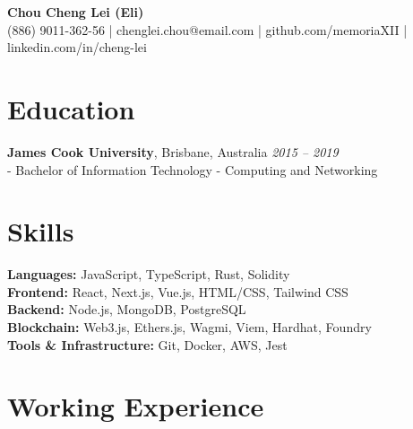 \documentclass[11pt,a4paper]{article}
\begin{document}
\begin{center}
    {\huge \textbf{Chou Cheng Lei (Eli)}}\\
    \vspace{5pt}
    (886) 9011-362-56 | chenglei.chou@email.com | github.com/memoriaXII | linkedin.com/in/cheng-lei
\end{center}

\vspace{5pt}

\section{Education}
\textbf{James Cook University}, Brisbane, Australia \hfill \textit{2015 -- 2019}\\
- Bachelor of Information Technology - Computing and Networking\\

\vspace{0pt}


\section{Skills}
\textbf{Languages:} JavaScript, TypeScript, Rust, Solidity\\
\textbf{Frontend:} React, Next.js, Vue.js, HTML/CSS, Tailwind CSS\\
\textbf{Backend:} Node.js, MongoDB, PostgreSQL\\
\textbf{Blockchain:} Web3.js, Ethers.js, Wagmi, Viem, Hardhat, Foundry\\
\textbf{Tools \& Infrastructure:} Git, Docker, AWS, Jest
\vspace{0pt}

\section{Working Experience}
\end{document}
